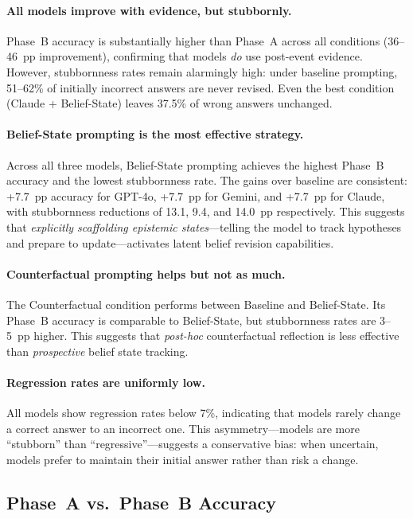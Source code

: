 \paragraph{All models improve with evidence, but stubbornly.}
Phase~B accuracy is substantially higher than Phase~A across all conditions (36--46~pp improvement), confirming that models \emph{do} use post-event evidence.  However, stubbornness rates remain alarmingly high: under baseline prompting, 51--62\% of initially incorrect answers are never revised.  Even the best condition (Claude + Belief-State) leaves 37.5\% of wrong answers unchanged.

\paragraph{Belief-State prompting is the most effective strategy.}
Across all three models, Belief-State prompting achieves the highest Phase~B accuracy and the lowest stubbornness rate.  The gains over baseline are consistent: +7.7~pp accuracy for GPT-4o, +7.7~pp for Gemini, and +7.7~pp for Claude, with stubbornness reductions of 13.1, 9.4, and 14.0~pp respectively.  This suggests that \emph{explicitly scaffolding epistemic states}---telling the model to track hypotheses and prepare to update---activates latent belief revision capabilities.

\paragraph{Counterfactual prompting helps but not as much.}
The Counterfactual condition performs between Baseline and Belief-State.  Its Phase~B accuracy is comparable to Belief-State, but stubbornness rates are 3--5~pp higher.  This suggests that \emph{post-hoc} counterfactual reflection is less effective than \emph{prospective} belief state tracking.

\paragraph{Regression rates are uniformly low.}
All models show regression rates below 7\%, indicating that models rarely change a correct answer to an incorrect one.  This asymmetry---models are more ``stubborn'' than ``regressive''---suggests a conservative bias: when uncertain, models prefer to maintain their initial answer rather than risk a change.

\subsection{Phase~A vs.~Phase~B Accuracy}


